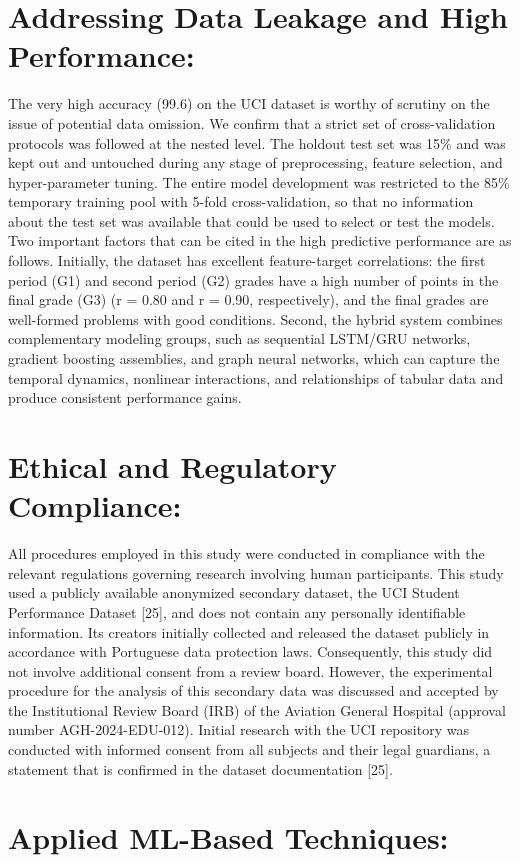 \documentclass[twocolumn]{svjour3}
\begin{document}
\section{Addressing Data Leakage and High Performance:}
The very high accuracy (99.6) on the UCI dataset is worthy of scrutiny on the issue of potential data omission. We confirm that a strict set of cross-validation protocols was followed at the nested level. The holdout test set was 15\% and was kept out and untouched during any stage of preprocessing, feature selection, and hyper-parameter tuning. The entire model development was restricted to the 85\% temporary training pool with 5-fold cross-validation, so that no information about the test set was available that could be used to select or test the models.
Two important factors that can be cited in the high predictive performance are as follows. Initially, the dataset has excellent feature-target correlations: the first period (G1) and second period (G2) grades have a high number of points in the final grade (G3) (r = 0.80 and r = 0.90, respectively), and the final grades are well-formed problems with good conditions. Second, the hybrid system combines complementary modeling groups, such as sequential LSTM/GRU networks, gradient boosting assemblies, and graph neural networks, which can capture the temporal dynamics, nonlinear interactions, and relationships of tabular data and produce consistent performance gains.
\section{Ethical and Regulatory Compliance:}
All procedures employed in this study were conducted in compliance with the relevant regulations governing research involving human participants. This study used a publicly available anonymized secondary dataset, the UCI Student Performance Dataset [25], and does not contain any personally identifiable information. Its creators initially collected and released the dataset publicly in accordance with Portuguese data protection laws. Consequently, this study did not involve additional consent from a review board. However, the experimental procedure for the analysis of this secondary data was discussed and accepted by the Institutional Review Board (IRB) of the Aviation General Hospital (approval number AGH-2024-EDU-012). Initial research with the UCI repository was conducted with informed consent from all subjects and their legal guardians, a statement that is confirmed in the dataset documentation [25].
\section{Applied ML-Based Techniques:}
\end{document}
